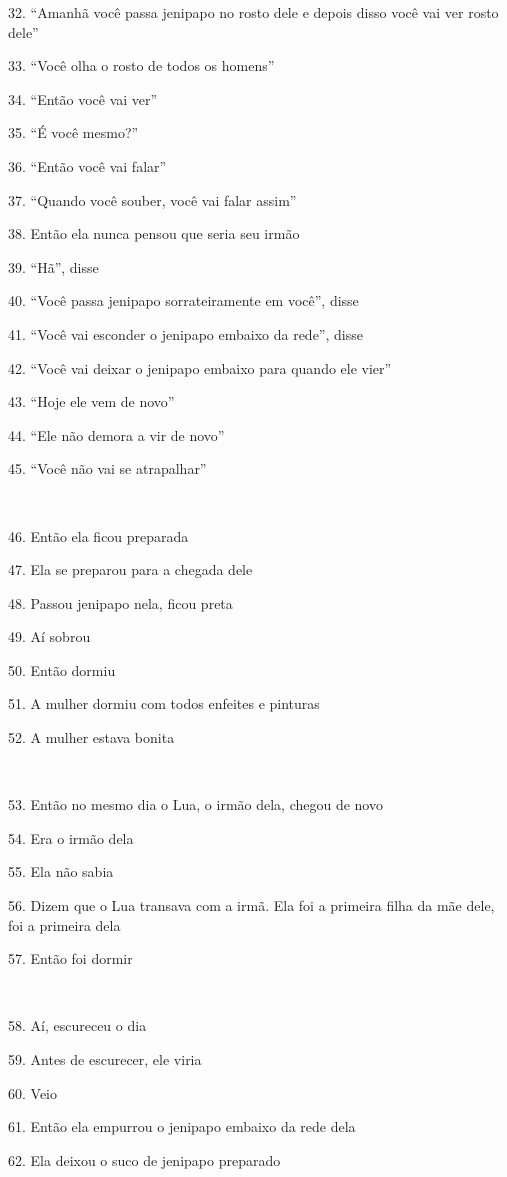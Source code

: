 32. ``Amanhã você passa jenipapo no rosto dele e depois disso você vai
ver rosto dele''

33. ``Você olha o rosto de todos os homens''

34. ``Então você vai ver''

35. ``É você mesmo?''

36. ``Então você vai falar''

37. ``Quando você souber, você vai falar assim''

38. Então ela nunca pensou que seria seu irmão

39. ``Hã'', disse

40. ``Você passa jenipapo sorrateiramente em você'', disse

41. ``Você vai esconder o jenipapo embaixo da rede'', disse

42. ``Você vai deixar o jenipapo embaixo para quando ele vier''

43. ``Hoje ele vem de novo''

44. ``Ele não demora a vir de novo''

45. ``Você não vai se atrapalhar''

~

46. Então ela ficou preparada

47. Ela se preparou para a chegada dele

48. Passou jenipapo nela, ficou preta

49. Aí sobrou

50. Então dormiu

51. A mulher dormiu com todos enfeites e pinturas

52. A mulher estava bonita

~

53. Então no mesmo dia o Lua, o irmão dela, chegou de novo

54. Era o irmão dela

55. Ela não sabia

56. Dizem que o Lua transava com a irmã. Ela foi a primeira filha da mãe
dele, foi a primeira dela

57. Então foi dormir

~

58. Aí, escureceu o dia

59. Antes de escurecer, ele viria

60. Veio

61. Então ela empurrou o jenipapo embaixo da rede dela

62. Ela deixou o suco de jenipapo preparado

